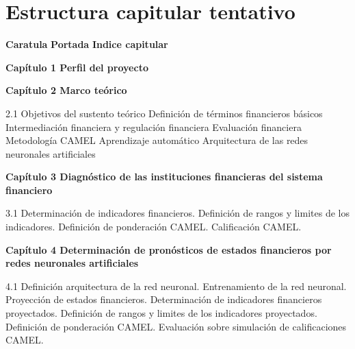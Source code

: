 \documentclass[
  12pt,
]{article}
\begin{document}
\newpage

\hypertarget{estructura-capitular-tentativo}{%
\section{Estructura capitular
tentativo}\label{estructura-capitular-tentativo}}

\textbf{Caratula} \newline  \textbf{Portada} \newline 
\textbf{Indice capitular}

\vspace{2.5mm}

\textbf{Capítulo 1 Perfil del proyecto} \vspace{2.5mm}

\vspace{2.5mm}

\textbf{Capítulo 2 Marco teórico} \vspace{2.5mm}

2.1 Objetivos del sustento teórico  Definición de términos
financieros básicos  Intermediación financiera y regulación
financiera  Evaluación financiera  Metodología
CAMEL  Aprendizaje automático  Arquitectura de
las redes neuronales artificiales

\vspace{2.5mm}

\textbf{Capítulo 3 Diagnóstico de las instituciones financieras del
sistema financiero} \vspace{2.5mm}

3.1 Determinación de indicadores financieros.  Definición de
rangos y limites de los indicadores.  Definición de
ponderación CAMEL.  Calificación CAMEL.

\vspace{2.5mm}

\textbf{Capítulo 4 Determinación de pronósticos de estados financieros
por redes neuronales artificiales} \vspace{2.5mm}

4.1 Definición arquitectura de la red neuronal. 
Entrenamiento de la red neuronal.  Proyección de estados
financieros.  Determinación de indicadores financieros
proyectados.  Definición de rangos y limites de los
indicadores proyectados.  Definición de ponderación CAMEL.
 Evaluación sobre simulación de calificaciones CAMEL.
\end{document}
